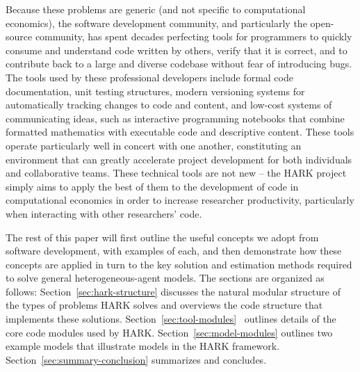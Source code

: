 \documentclass[10pt,twocolumn]{article}
\begin{document}
Because these problems are generic (and not specific to computational economics), the software development community, and particularly the open-source community, has spent decades perfecting tools for programmers to quickly consume and understand code written by others, verify that it is correct, and to contribute back to a large and diverse codebase without fear of introducing bugs. The tools used by these professional developers include formal code documentation, unit testing structures, modern versioning systems for automatically tracking changes to code and content, and low-cost systems of communicating ideas, such as interactive programming notebooks that combine formatted mathematics with executable code and descriptive content. These tools operate particularly well in concert with one another, constituting an environment that can greatly accelerate project development for both individuals and collaborative teams. These technical tools are not new -- the HARK project simply aims to apply the best of them to the development of code in computational economics in order to increase researcher productivity, particularly when interacting with other researchers' code.



The rest of this paper will first outline the useful concepts we adopt from software development, with examples of each, and then demonstrate how these concepts are applied in turn to the key solution and estimation methods required to solve general heterogeneous-agent models.  The sections are organized as follows:
\mbox{Section \ref{sec:hark-structure}} discusses the natural modular
structure of the types of problems HARK solves and overviews the code
structure that implements these solutions.
\mbox{Section \ref{sec:tool-modules} } outlines details of the core code
modules used by HARK. \mbox{Section \ref{sec:model-modules}} outlines
two example models that illustrate models in the HARK framework.
\mbox{Section \ref{sec:summary-conclusion}} summarizes and
concludes.
\end{document}
